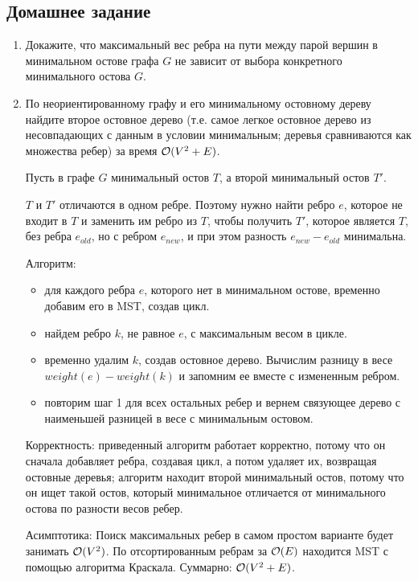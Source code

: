 \subsection{Домашнее задание}
\begin{enumerate}
  \item
    Докажите, что максимальный вес ребра на пути между парой вершин в минимальном остове графа $G$
    не зависит от выбора конкретного минимального остова $G$.
    
  \item 
    По неориентированному графу и его минимальному остовному дереву найдите второе остовное
    дерево (т.е. самое легкое остовное дерево из несовпадающих с данным в условии минимальным;
    деревья сравниваются как множества ребер) за время $\mathcal{O}(V^2 + E)$.

    \begin{solution}
      Пусть в графе $G$ минимальный остов $T$, а второй минимальный остов $T'$.
      
      $T$ и $T'$ отличаются в одном ребре. Поэтому нужно найти ребро $e$, которое не входит в $T$ и заменить им ребро из $T$, чтобы получить $T'$, которое является $T$, без ребра $e_{old}$, но с ребром $e_{new}$, и при этом разность $e_{new}-e_{old}$ минимальна.
      
      Алгоритм:
      \begin{itemize}
        \item для каждого ребра $e$, которого нет в минимальном остове, временно добавим его в MST, создав цикл.
        \item найдем ребро $k$, не равное $e$, с максимальным весом в цикле.
        \item временно удалим $k$, создав остовное дерево. Вычислим разницу в весе $weight(e)-weight(k)$ и запомним ее вместе с измененным ребром.
        \item повторим шаг 1 для всех остальных ребер и вернем связующее дерево с наименьшей разницей в весе с минимальным остовом.
      \end{itemize}
      Корректность:
      приведенный алгоритм работает корректно, потому что он сначала добавляет ребра, создавая цикл, а потом удаляет их, возвращая остовные деревья; алгоритм находит второй минимальный остов, потому что он ищет такой остов, который минимальное отличается от минимального остова по разности весов ребер.

      Асимптотика:
      Поиск максимальных ребер в самом простом варианте будет занимать $\mathcal{O}(V^2)$. По отсортированным ребрам за $\mathcal{O}(E)$ находится MST с помощью алгоритма Краскала. Суммарно: $\mathcal{O}(V^2 + E)$.
    \end{solution}


\end{enumerate}
